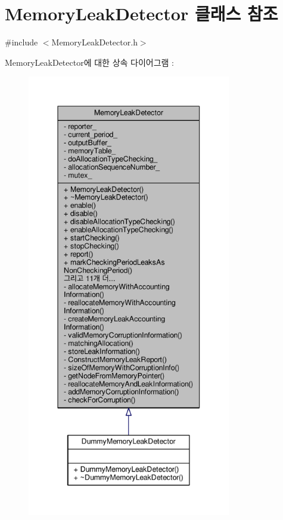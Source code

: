 \hypertarget{class_memory_leak_detector}{}\section{Memory\+Leak\+Detector 클래스 참조}
\label{class_memory_leak_detector}


{\ttfamily \#include $<$Memory\+Leak\+Detector.\+h$>$}



Memory\+Leak\+Detector에 대한 상속 다이어그램 \+: 
\nopagebreak
\begin{figure}[H]
\begin{center}
\leavevmode
\includegraphics[height=550pt]{class_memory_leak_detector__inherit__graph}
\end{center}
\end{figure}


